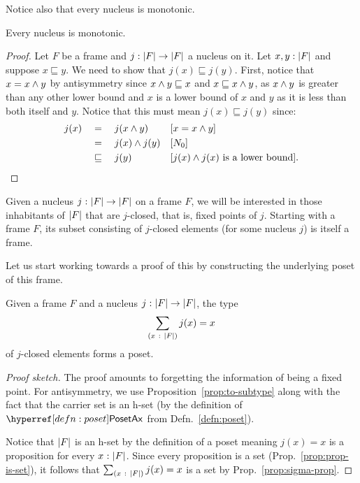 Notice also that every nucleus is monotonic.
\begin{prop}\label{prop:nucleus-mono}
  Every nucleus is monotonic.
\end{prop}
\begin{proof}
  Let $F$ be a frame and $j : \left| F \right| \rightarrow \left| F \right|$ a nucleus on it. Let
  $x, y:\left| F \right|$ and suppose $x \sqsubseteq y$. We need to show that $j(x) \sqsubseteq j(y)$. First,
  notice that $x = x \wedge y$ by antisymmetry since $x \wedge y \sqsubseteq x$ and $x \sqsubseteq
  x \wedge y$, as $x \wedge y$ is greater than any other lower bound and $x$ is a lower
  bound of $x$ and $y$ as it is less than both itself and $y$. Notice that this must mean
  $j(x) \sqsubseteq j(y)$ since:
  \begin{align*}
    j(x) &\quad=\quad j(x \wedge y)        && [x = x \wedge y]                              \\
         &\quad=\quad j(x) \wedge j(y)     && [N_0]                                          \\
         &\quad\sqsubseteq\quad {j(y)}                && [\text{$j(x) \wedge j(x)$ is a lower bound}]  .
  \end{align*}
\end{proof}

Given a nucleus $j\hspace{0.1mm}:\hspace{0.1mm}\left| F \right| \rightarrow \left| F \right|$ on a frame $F$, we will be interested in
those inhabitants of $\left| F \right|$ that are $j$-closed, that is, fixed points of $j$. Starting
with a frame $F$, its subset consisting of $j$-closed elements (for some nucleus $j$) is
itself a frame.

Let us start working towards a proof of this by constructing the underlying poset of this
frame.
\begin{prop}\label{prop:fixed-point-poset}
  Given a frame $F$ and a nucleus $j\hspace{0.1mm}:\hspace{0.1mm}\left| F \right| \rightarrow \left| F \right|$, the type
  \begin{equation*}
    \sum_{(x~:~\left| F \right|)} j(x) = x
  \end{equation*}
   of $j$-closed elements forms a poset.
\end{prop}
\begin{proof}[Proof sketch]
  The proof amounts to forgetting the information of being a fixed point. For
  antisymmetry, we use Proposition~\ref{prop:to-subtype} along with the fact that the
  carrier set is an h-set (by the definition of $\posetaxnm{}$ from
  Defn.~\ref{defn:poset}).

  Notice that $\left| F \right|$ is an h-set by the definition of a poset meaning $j(x) = x$ is a
  proposition for every $x\hspace{0.1mm}:\hspace{0.1mm}\left| F \right|$. Since every proposition is a set
  (Prop.~\ref{prop:prop-is-set}), it follows that $\sum_{(x~:~\left| F \right|)} j(x) = x$ is a
  set by Prop.~\ref{prop:sigma-prop}.
\end{proof}

